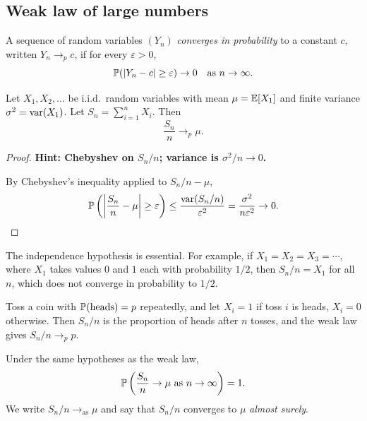 \documentclass[a4paper]{article}
\begin{document}
\subsection{Weak law of large numbers}

\begin{defi}
  A sequence of random variables $(Y_n)$ \emph{converges in probability} to a constant $c$, written $Y_n \to_p c$, if for every $\varepsilon > 0$,
  \[
    \P(|Y_n - c| \geq \varepsilon) \to 0 \quad \text{as } n \to \infty.
  \]
\end{defi}

\begin{thm}
  Let $X_1, X_2, \dotsc$ be i.i.d.\ random variables with mean $\mu = \E[X_1]$ and finite variance $\sigma^2 = \var(X_1)$. Let $S_n = \sum_{i = 1}^n X_i$. Then
  \[
    \frac{S_n}{n}\to_p \mu.
  \]
\end{thm}

\begin{proof}
  \textbf{Hint: Chebyshev on $S_n/n$; variance is $\sigma^2/n \to 0$.}

  By Chebyshev's inequality applied to $S_n/n - \mu$,
  \[
    \P\left(\left|\frac{S_n}{n} - \mu\right| \geq \varepsilon\right) \leq \frac{\var(S_n/n)}{\varepsilon^2} = \frac{\sigma^2}{n\varepsilon^2} \to 0. \qedhere
  \]
\end{proof}

\begin{remark}
  The independence hypothesis is essential. For example, if $X_1 = X_2 = X_3 = \cdots$, where $X_1$ takes values $0$ and $1$ each with probability $1/2$, then $S_n/n = X_1$ for all $n$, which does not converge in probability to $1/2$.
\end{remark}

\begin{eg}
  Toss a coin with $\P(\text{heads}) = p$ repeatedly, and let $X_i = 1$ if toss $i$ is heads, $X_i = 0$ otherwise. Then $S_n/n$ is the proportion of heads after $n$ tosses, and the weak law gives $S_n/n \to_p p$.
\end{eg}

\begin{thm}
  Under the same hypotheses as the weak law,
  \[
    \P\left(\frac{S_n}{n}\to \mu\text{ as }n\to \infty\right) = 1.
  \]
  We write $S_n/n \to_{\mathrm{as}} \mu$ and say that $S_n/n$ converges to $\mu$ \emph{almost surely}.
\end{thm}
\end{document}
